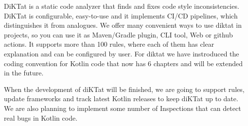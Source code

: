 \par DiKTat is a static code analyzer that finds and fixes code style inconsistencies. DiKTat is configurable, easy-to-use and it implements CI/CD pipelines, which distinguishes it from analogues. We offer many convenient ways to use diktat in projects, so you can use it as Maven/Gradle plugin, CLI tool, Web or github actions. It supports more than 100 rules, where each of them has clear explanation and can be configured by user. For diktat we have instroduced the coding convention for Kotlin code that now has 6 chapters and will be extended in the future.
\par When the development of diKTat will be finished, we are going to support rules, update frameworks and track latest Kotlin releases to keep diKTat up to date. We are also planning to implement some number of Inspections that can detect real bugs in Kotlin code.